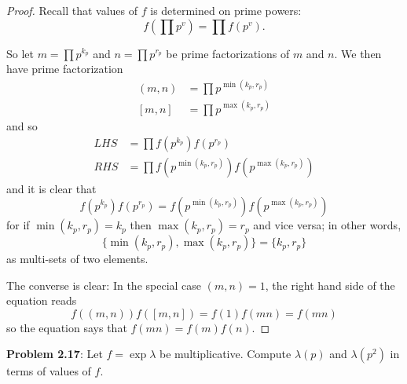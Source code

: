 \documentclass{article}
\begin{document}
\begin{proof}
Recall that values of $f$ is determined on prime powers:
$$f\left(\prod p^v\right) = \prod f(p^v).$$

So let $m = \prod p^{k_p}$ and $n = \prod p^{r_p}$ be prime factorizations of $m$ and $n$. We then have prime factorization
\begin{align*}
(m, n) &= \prod p^{\min(k_p, r_p)}\\
[m, n] &= \prod p^{\max(k_p, r_p)}
\end{align*}
and so
\begin{align*}
LHS &= \prod f(p^{k_p}) f(p^{r_p}) \\
RHS &= \prod f(p^{\min(k_p, r_p)}) f(p^{\max(k_p, r_p)})
\end{align*}
and it is clear that
$$f(p^{k_p}) f(p^{r_p}) = f(p^{\min(k_p, r_p)}) f(p^{\max(k_p, r_p)})$$
for if $\min(k_p, r_p) = k_p$ then $\max(k_p, r_p) = r_p$ and vice versa; in other words,
$$\{\min(k_p, r_p), \max(k_p, r_p)\} = \{k_p, r_p\}$$
as multi-sets of two elements.

The converse is clear: In the special case $(m, n) = 1$, the right hand side of the equation reads
$$f((m, n)) f([m, n]) = f(1) f(mn) = f(mn)$$
so the equation says that $f(mn) = f(m) f(n)$.
\end{proof}

\textbf{Problem 2.17}: Let $f = \exp \lambda$ be multiplicative. Compute $\lambda(p)$ and $\lambda(p^2)$ in terms of values of $f$.
\end{document}
